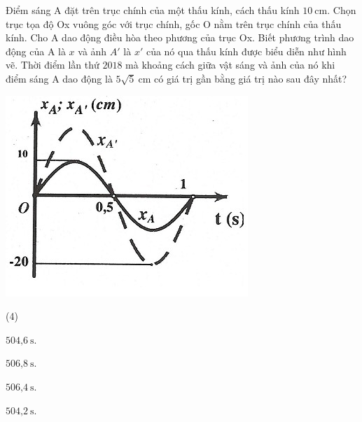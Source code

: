 \begin{enumerate}[label=\bfseries Câu \arabic*:]
{		Điểm sáng A đặt trên trục chính của một thấu kính, cách thấu kính $10\ \text{cm}$. Chọn trục tọa độ Ox vuông góc với trục chính, gốc O nằm trên trục chính của thấu kính. Cho A dao động điều hòa theo phương của trục Ox. Biết phương trình dao động của A là $x$ và ảnh $A'$  là $x'$  của nó qua thấu kính được biểu diễn như hình vẽ. Thời điểm lần thứ $2018$ mà khoảng cách giữa vật sáng và ảnh của nó khi điểm sáng A dao động là $5\sqrt{5}\ \text{cm}$ có giá trị gần bằng giá trị nào sau đây nhất?
		\begin{center}
			\includegraphics[scale=0.8]{../figs/VN12-PH-06-P-005-1-h2.jpg}
		\end{center}	
	}
\end{enumerate}
